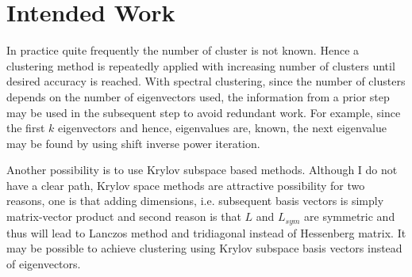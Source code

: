 \documentclass[10pt,a4paper, nocenter]{report}
\begin{document}
    \chapter{Intended Work}
    In practice quite frequently the number of cluster is not known. Hence a clustering method is repeatedly applied with increasing number of clusters until desired accuracy is reached. With spectral clustering, since the number of clusters depends on the number of eigenvectors used, the information from a prior step may be used in the subsequent step to avoid redundant work. For example, since the first $k$ eigenvectors and hence, eigenvalues are, known, the next eigenvalue may be found by using shift inverse power iteration. 

    Another possibility is to use Krylov subspace based methods. Although I do not have a clear path, Krylov space methods are attractive possibility for two reasons, one is that adding dimensions, i.e. subsequent basis vectors is simply matrix-vector product and second reason is that $L$ and $L_{sym}$ are symmetric and thus will lead to Lanczos method and tridiagonal instead of Hessenberg matrix. It may be possible to achieve clustering using Krylov subspace basis vectors instead of eigenvectors. 


    \appendix
\end{document}
